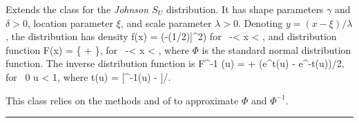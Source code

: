 
Extends the class  for
the {\em Johnson $S_U$\/} distribution.
It  has shape parameters $\gamma$ and $\delta > 0$, location parameter 
$\xi$, and scale parameter $\lambda > 0$.
Denoting $y=(x-\xi)/\lambda$, the distribution has density
\eq
 f(x) =\html{\delta/(}\latex{\frac {\delta}} {\lambda{}\sqrt{2\pi}}
  \exp\left(-(1/2)\left[\gamma+\delta\ln\left[y +
        \sqrt{y^2 + 1}\right]\right]^2\right) \html{)}
 \qquad  \mbox{for } -\infty < x < \infty,
\endeq
and distribution function
\eq
 F(x) = \Phi\left\{ \gamma + \delta\ln
     \right\},
 \qquad  \mbox{for } -\infty < x < \infty,
\endeq
where $\Phi$ is the standard normal distribution function.
The inverse distribution function is
\eq
 F^{-1} (u) = \xi + \lambda(e^{t(u)} - e^{-t(u)})/2,
     \qquad\mbox{for }  0 \le u < 1,
\endeq
where
\eq
  t(u) = [\Phi^{-1}(u) - \gamma]/\delta.
\endeq

This class relies on the methods   and
    of  to
  approximate $\Phi$ and $\Phi^{-1}$.


\bigskip\hrule

